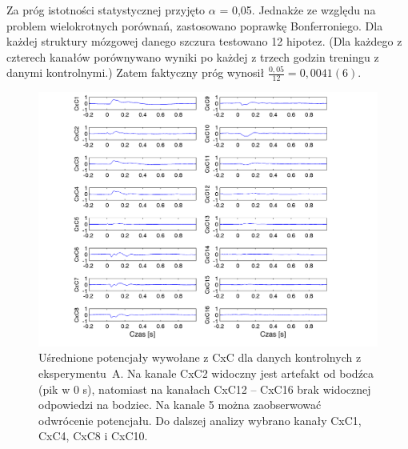\documentclass{pracamgr}
\begin{document}
	Za próg istotności statystycznej przyjęto $\alpha$ = 0,05. Jednakże ze względu na problem wielokrotnych porównań, zastosowano poprawkę Bonferroniego.
	Dla każdej struktury mózgowej danego szczura testowano 12 hipotez. (Dla każdego z czterech kanałów porównywano wyniki po każdej z trzech godzin treningu z danymi kontrolnymi.) Zatem faktyczny próg wynosił $\frac{0,05}{12}=0,0041(6)$.
	\begin{figure}[h]
		\begin{center}
			\includegraphics[width=\columnwidth]{16_kanalow.png}
		\end{center}
		\caption{Uśrednione potencjały wywołane z CxC dla danych kontrolnych z eksperymentu~A. Na kanale CxC2 widoczny jest artefakt od bodźca (pik w 0 s), natomiast na kanałach CxC12 -- CxC16 brak widocznej odpowiedzi na bodziec. Na kanale 5 można zaobserwować odwrócenie potencjału. Do dalszej analizy wybrano kanały CxC1, CxC4, CxC8 i CxC10.}
		\label{rys:16_kanalow}
	\end{figure}
	\newpage
\end{document}
